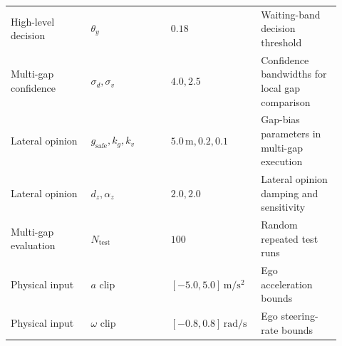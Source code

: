 \begin{uomappendix}
{\begin{supertabular}{L{0.23\linewidth}L{0.23\linewidth}L{0.23\linewidth}L{0.23\linewidth}}
High-level decision & \(\theta_y\) & \(0.18\) & Waiting-band decision threshold \\
Multi-gap confidence & \(\sigma_d,\sigma_v\) & \(4.0,2.5\) & Confidence bandwidths for local gap comparison \\
Lateral opinion & \(g_{\mathrm{safe}},k_g,k_v\) & \(5.0\,\mathrm{m},0.2,0.1\) & Gap-bias parameters in multi-gap execution \\
Lateral opinion & \(d_z,\alpha_z\) & \(2.0,2.0\) & Lateral opinion damping and sensitivity \\
Multi-gap evaluation & \(N_{\mathrm{test}}\) & \(100\) & Random repeated test runs \\
Physical input & \(a\) clip & \([-5.0,5.0]\,\mathrm{m / s^2}\) & Ego acceleration bounds \\
Physical input & \(\omega\) clip & \([-0.8,0.8]\,\mathrm{rad / s}\) & Ego steering-rate bounds \\
\bottomrule
\end{supertabular}
}

\end{uomappendix}



